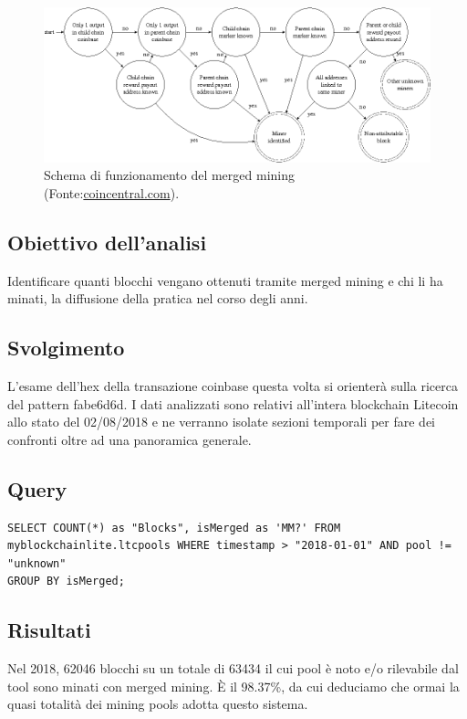 \begin{figure}
	\centering
	\includegraphics[width=1.0\linewidth]{images/mergedminingdiagramsemanticscholar}
	\caption{Schema di funzionamento del merged mining (Fonte:\url{coincentral.com}).}
	\label{fig:mergedminingdiagramsemanticscholar}
\end{figure}

\subsection{Obiettivo dell’analisi}
Identificare quanti blocchi vengano ottenuti tramite merged mining e chi li ha minati, la diffusione della pratica nel corso degli anni.
\subsection{Svolgimento}
L’esame dell’hex della transazione coinbase questa volta si orienterà sulla ricerca del pattern fabe6d6d. I dati analizzati sono relativi all'intera blockchain Litecoin allo stato del 02/08/2018 e ne verranno isolate sezioni temporali per fare dei confronti oltre ad una panoramica generale.
\subsection{Query}

\begin{lstlisting}
SELECT COUNT(*) as "Blocks", isMerged as 'MM?' FROM myblockchainlite.ltcpools WHERE timestamp > "2018-01-01" AND pool != "unknown"
GROUP BY isMerged;
\end{lstlisting}

\subsection{Risultati}


Nel 2018, 62046 blocchi su un totale di 63434 il cui pool è noto e/o rilevabile dal tool sono minati con merged mining. È il 98.37\%, da cui deduciamo che ormai la quasi totalità dei mining pools adotta questo sistema.


